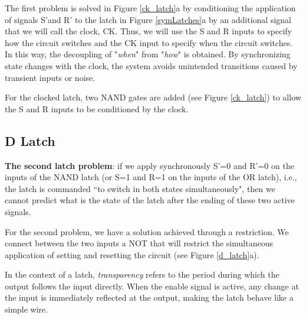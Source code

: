 
The first problem is solved in Figure \ref{ck_latch}a by conditioning the application of signals S'and R' to the latch in Figure \ref{symLatches}a by an additional signal that we will call the clock, CK. Thus, we will use the S and R inputs to specify how the circuit switches and the CK input to specify when the circuit switches. In this way, the decoupling of "{\em when}" from "{\em how}" is obtained. By synchronizing state changes with the clock, the system avoids unintended transitions caused by transient inputs or noise. 

For the clocked latch, two NAND gates are added (see Figure \ref{ck_latch}) to allow the S and R inputs to be conditioned by the clock.



\subsection{D Latch}
{\bf The second latch problem}: if we apply synchronously
S'=0 and R'=0 on the inputs of the NAND latch  (or S=1 and R=1 on the
inputs of the OR latch), i.e., the latch is commanded ``to switch in
both states simultaneously", then we cannot predict what is the
state of the latch after the ending of these two active signals.

For the second problem, we have a solution achieved through a restriction. We connect between the two inputs a NOT that will restrict the simultaneous application of setting and resetting the circuit (see Figure \ref{d_latch}a). 


In the context of a latch, \textit{transparency} refers to the period during which the output follows the input directly. When the enable signal is active, any change at the input is immediately reflected at the output, making the latch behave like a simple wire. 

